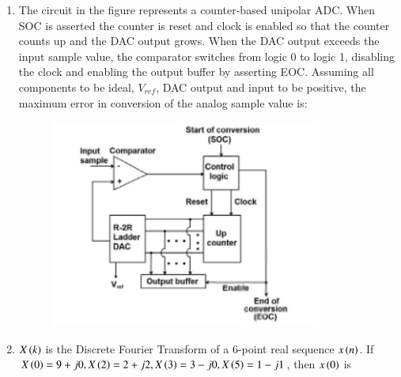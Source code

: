 \documentclass[journal,12pt,onecolumn]{IEEEtran}
\theoremstyle{remark}
\begin{document}
\begin{enumerate}
    

    \item The circuit in the figure represents a counter-based unipolar ADC. When SOC is asserted the counter is reset and clock is enabled so that the counter counts up and the DAC output grows. When the DAC output exceeds the input sample value, the comparator switches from logic 0 to logic 1, disabling the clock and enabling the output buffer by asserting EOC. Assuming all components to be ideal, $V_{ref}$, DAC output and input to be positive, the maximum error in conversion of the analog sample value is:
    \begin{figure}[H]
        \centering
        \includegraphics[width=0.6\columnwidth]{q43}
        \caption*{}
        \label{Q43}
    \end{figure}

    \hfill{}
    \begin{enumerate}
    \end{enumerate}

    

    \item $X\left(k\right)$ is the Discrete Fourier Transform of a 6-point real sequence $x\left(n\right)$. If $X\left(0\right) = 9+j0, X\left(2\right) = 2+j2, X\left(3\right) = 3-j0, X\left(5\right) = 1-j1$, then $x\left(0\right)$ is

    \hfill{}
        \begin{enumerate}
        \end{enumerate}


\end{enumerate}
\end{document}
